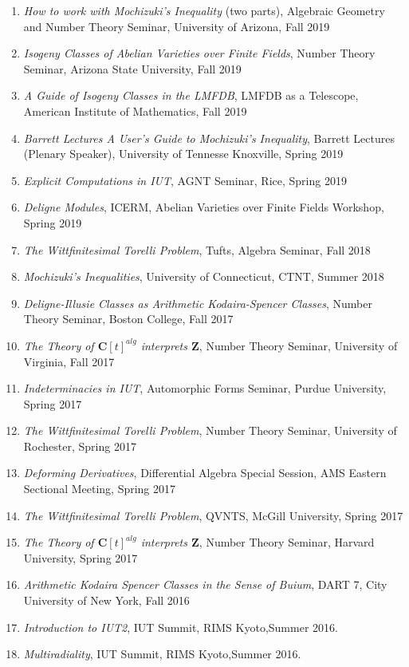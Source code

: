 \documentclass[a4paper,10pt]{article}
\newcommand{\CC}{\mathbf{C}}
\newcommand{\ZZ}{\mathbf{Z}}
\begin{document}
\begin{enumerate}
	\item \emph{How to work with Mochizuki's Inequality} (two parts), Algebraic Geometry and Number Theory Seminar, University of Arizona, Fall 2019
	\item \emph{Isogeny Classes of Abelian Varieties over Finite Fields}, Number Theory Seminar, Arizona State University, Fall 2019
	\item \emph{A Guide of Isogeny Classes in the LMFDB}, LMFDB as a Telescope, American Institute of Mathematics, Fall 2019
	\item \emph{Barrett Lectures	A User's Guide to Mochizuki's Inequality}, Barrett Lectures (Plenary Speaker), University of Tennesse Knoxville, Spring 2019
	\item \emph{Explicit Computations in IUT}, AGNT Seminar, Rice, Spring 2019
	\item \emph{Deligne Modules}, ICERM, Abelian Varieties over Finite Fields Workshop, Spring 2019
	\item \emph{The Wittfinitesimal Torelli Problem}, Tufts, Algebra Seminar, Fall 2018
	\item \emph{Mochizuki's Inequalities}, University of Connecticut, CTNT, Summer 2018
	\item \emph{Deligne-Illusie Classes as Arithmetic Kodaira-Spencer Classes}, Number Theory Seminar, Boston College, Fall 2017
	\item \emph{The Theory of $\CC[t]^{alg}$ interprets $\ZZ$}, Number Theory Seminar, University of Virginia, Fall 2017
	\item \emph{Indeterminacies in IUT}, Automorphic Forms Seminar, Purdue University, Spring 2017
	\item \emph{The Wittfinitesimal Torelli Problem}, Number Theory Seminar, University of Rochester, Spring 2017 
	\item \emph{Deforming Derivatives}, Differential Algebra Special Session, AMS Eastern Sectional Meeting, Spring 2017
	\item \emph{The Wittfinitesimal Torelli Problem}, QVNTS, McGill University, Spring 2017 
	\item \emph{The Theory of $\CC[t]^{alg}$ interprets $\ZZ$}, Number Theory Seminar, Harvard University, Spring 2017
	\item \emph{Arithmetic Kodaira Spencer Classes in the Sense of Buium}, DART 7, City University of New York, Fall 2016 
	\item \emph{Introduction to IUT2}, IUT Summit, RIMS Kyoto,Summer 2016.
	\item \emph{Multiradiality},  IUT Summit, RIMS Kyoto,Summer 2016. 

\end{enumerate}
\end{document}
